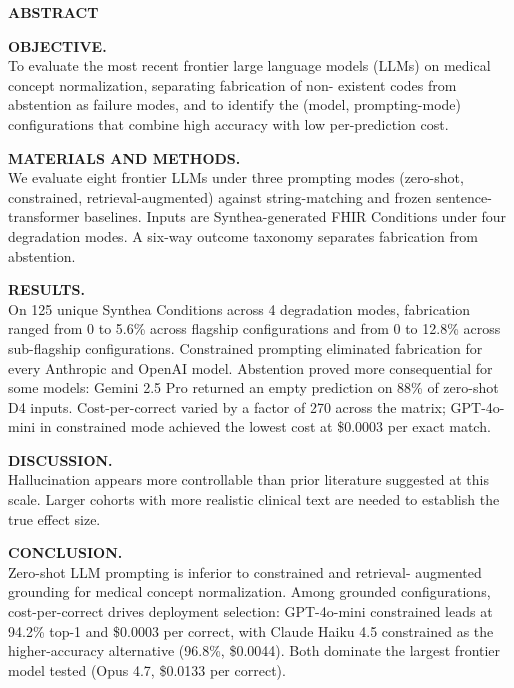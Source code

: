 %
%

\begin{center}
{\Large\bfseries ABSTRACT\par}
\end{center}

\noindent\textbf{OBJECTIVE.}\\
To evaluate the most recent frontier large language models (LLMs)
on medical concept normalization, separating fabrication of non-
existent codes from abstention as failure modes, and to identify
the (model, prompting-mode) configurations that combine high
accuracy with low per-prediction cost.

\medskip
\noindent\textbf{MATERIALS AND METHODS.}\\
We evaluate eight frontier LLMs under three prompting modes
(zero-shot, constrained, retrieval-augmented) against
string-matching and frozen sentence-transformer baselines.
Inputs are Synthea-generated FHIR Conditions under four
degradation modes. A six-way outcome taxonomy separates
fabrication from abstention.

\medskip
\noindent\textbf{RESULTS.}\\
On 125 unique Synthea Conditions across 4 degradation modes,
fabrication ranged from 0 to 5.6\% across flagship configurations
and from 0 to 12.8\% across sub-flagship configurations.
Constrained prompting eliminated fabrication for every Anthropic
and OpenAI model. Abstention proved more consequential for some
models: Gemini 2.5 Pro returned an empty prediction on 88\% of
zero-shot D4 inputs. Cost-per-correct varied by a factor of 270
across the matrix; GPT-4o-mini in constrained mode achieved the
lowest cost at \$0.0003 per exact match.

\medskip
\noindent\textbf{DISCUSSION.}\\
Hallucination appears more controllable than prior literature
suggested at this scale. Larger cohorts with more realistic
clinical text are needed to establish the true effect size.

\medskip
\noindent\textbf{CONCLUSION.}\\
Zero-shot LLM prompting is inferior to constrained and retrieval-
augmented grounding for medical concept normalization. Among grounded configurations,
cost-per-correct drives deployment selection: GPT-4o-mini
constrained leads at 94.2\% top-1 and \$0.0003 per correct, with
Claude Haiku 4.5 constrained as the higher-accuracy alternative
(96.8\%, \$0.0044). Both dominate the largest frontier model
tested (Opus 4.7, \$0.0133 per correct).
